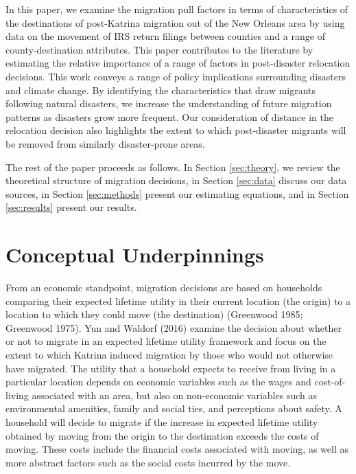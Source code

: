 \documentclass[]{article}
\begin{document}
In this paper, we examine the migration pull factors in terms of
characteristics of the destinations of post-Katrina migration out of the
New Orleans area by using data on the movement of IRS return filings
between counties and a range of county-destination attributes. This
paper contributes to the literature by estimating the relative
importance of a range of factors in post-disaster relocation decisions.
This work conveys a range of policy implications surrounding disasters
and climate change. By identifying the characteristics that draw
migrants following natural disasters, we increase the understanding of
future migration patterns as disasters grow more frequent. Our
consideration of distance in the relocation decision also highlights the
extent to which post-disaster migrants will be removed from similarly
disaster-prone areas.

The rest of the paper proceeds as follows. In Section \ref{sec:theory},
we review the theoretical structure of migration decisions, in Section
\ref{sec:data} discuss our data sources, in Section \ref{sec:methods}
present our estimating equations, and in Section \ref{sec:results}
present our results.

\section{\texorpdfstring{Conceptual Underpinnings
\label{sec:theory}}{Conceptual Underpinnings }}\label{conceptual-underpinnings}

From an economic standpoint, migration decisions are based on households
comparing their expected lifetime utility in their current location (the
origin) to a location to which they could move (the destination)
(Greenwood 1985; Greenwood 1975). Yun and Waldorf (2016) examine the
decision about whether or not to migrate in an expected lifetime utility
framework and focus on the extent to which Katrina induced migration by
those who would not otherwise have migrated. The utility that a
household expects to receive from living in a particular location
depends on economic variables such as the wages and cost-of-living
associated with an area, but also on non-economic variables such as
environmental amenities, family and social ties, and perceptions about
safety. A household will decide to migrate if the increase in expected
lifetime utility obtained by moving from the origin to the destination
exceeds the costs of moving. These costs include the financial costs
associated with moving, as well as more abstract factors such as the
social costs incurred by the move.
\end{document}
